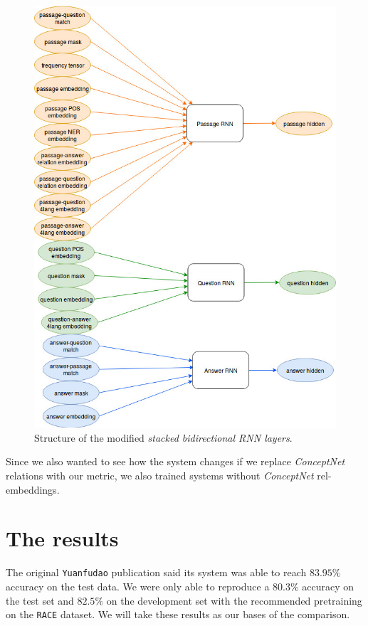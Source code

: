 \begin{figure}[h!]
	\centering
	\includegraphics[scale=0.4]{TriAN_rnn_with_4lang.jpg}
	\caption{Structure of the modified \textit{stacked bidirectional RNN layers}.}
	\label{fig:rnn_4lang}
\end{figure}

Since we also wanted to see how the system changes if we replace \textit{ConceptNet} relations with our metric, we also trained systems without \textit{ConceptNet} rel-embeddings.

\FloatBarrier

\section{The results}
The original \texttt{Yuanfudao} \cite{Wang:2018} publication said its system was able to reach $83.95\%$ accuracy on the test data. We were only able to reproduce a $80.3\%$ accuracy on the test set and $82.5\%$ on the development set with the recommended pretraining on the \texttt{RACE} \cite{Lai:2017} dataset. We will take these results as our bases of the comparison.


